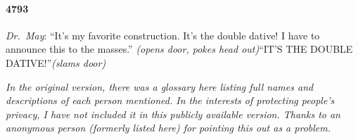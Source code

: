 \documentclass[10pt]{memoir}
\newcommand{\intro}[1]{\emph{#1}}
\begin{document}
\paragraph{4793} \intro{Dr.\ May}: ``It's my favorite construction. It's the double dative! I have to announce this to the masses.'' \emph{(opens door, pokes head out)}\enspace ``IT'S THE \mbox{DOUBLE} $\:\!$DATIVE!''\enspace \emph{(slams door)}

\backmatter
\emph{In the original version, there was a glossary here listing full names and descriptions of each person mentioned. In the interests of protecting people's privacy, I have not included it in this publicly available version. Thanks to an anonymous person (formerly listed here) for pointing this out as a problem.}
\end{document}
